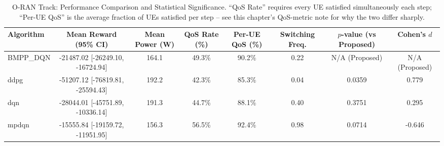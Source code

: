 \begin{table}[h]
\centering
\caption{O-RAN Track: Performance Comparison and Statistical Significance. ``QoS Rate'' requires every UE satisfied simultaneously each step; ``Per-UE QoS'' is the average fraction of UEs satisfied per step -- see this chapter's QoS-metric note for why the two differ sharply.}
\begin{tabular}{lccccccc}
\hline
Algorithm & Mean Reward (95\% CI) & Mean Power (W) & QoS Rate (\%) & Per-UE QoS (\%) & Switching Freq. & $p$-value (vs Proposed) & Cohen's $d$ \\
\hline
BMPP_DQN & -21487.02 [-26249.10, -16724.94] & 164.1 & 49.3\% & 90.2\% & 0.22 & N/A (Proposed) & N/A (Proposed) \\
ddpg & -51207.12 [-76819.81, -25594.43] & 192.2 & 42.3\% & 85.3\% & 0.04 & 0.0359 & 0.779 \\
dqn & -28044.01 [-45751.89, -10336.14] & 191.3 & 44.7\% & 88.1\% & 0.40 & 0.3751 & 0.295 \\
mpdqn & -15555.84 [-19159.72, -11951.95] & 156.3 & 56.5\% & 92.4\% & 0.98 & 0.0714 & -0.646 \\
\hline
\end{tabular}
\end{table}
